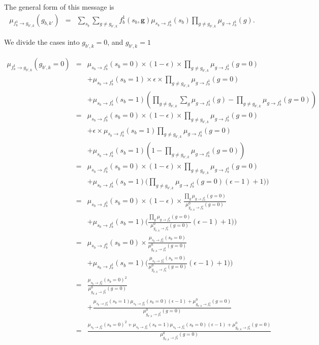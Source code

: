 \documentclass[11pt]{article}
\newcommand{\fb}[1]{f_b^{#1}}
\newcommand{\mSbFb}[1]{\mu_{s_{b} \rightarrow \fb{#1}}}
\begin{document}
The general form of this message is
\begin{eqnarray}
\mu_{\fb1 \rightarrow g_{b',k}}(g_{b,k'}) &=& \sum_{s_b} \sum_{g \neq g_{b',k}} \fb1(s_b,\mathbf{g}) \mSbFb1(s_b) \prod_{g \neq g_{b',k}} \mu_{g \rightarrow \fb1}(g).
\end{eqnarray}

We divide the cases into  $g_{b',k}=0$, and  $g_{b',k}=1$

\begin{eqnarray}
\mu_{\fb1 \rightarrow g_{b',k}}(g_{b',k}=0) &=& \mSbFb1(s_b=0) \times (1-\epsilon)  \times   \prod_{g \neq g_{b',k}}\mu_{g \rightarrow \fb1}(g=0) \\
& & +  \mSbFb1(s_b=1) \times \epsilon \times \prod_{g \neq g_{b',k}}\mu_{g \rightarrow \fb1}(g=0) \nonumber \\
& & +  \mSbFb1(s_b=1) (\prod_{g \neq g_{b',k}}\sum_{g} \mu_{g \rightarrow \fb1}(g) - \prod_{g \neq g_{b',k}} \mu_{g \rightarrow \fb1}(g=0) )  \nonumber \\
%
&=&  \mSbFb1(s_b=0) \times (1-\epsilon)  \times  \prod_{g \neq g_{b',k}}\mu_{g \rightarrow \fb1}(g=0) \\
& & + \epsilon \times \mSbFb1(s_b=1) \prod_{g \neq g_{b',k}}\mu_{g \rightarrow \fb1}(g=0) \nonumber \\
& & +  \mSbFb1(s_b=1) (1 - \prod_{g \neq g_{b',k}} \mu_{g \rightarrow \fb1}(g=0)) \nonumber \\
%
&=& \mSbFb1(s_b=0) \times (1-\epsilon)  \times  \prod_{g \neq g_{b',k}}\mu_{g \rightarrow \fb1}(g=0) \nonumber \\
& & +  \mSbFb1(s_b=1) \big(   \prod_{g \neq g_{b',k}} \mu_{g \rightarrow \fb1}(g=0)  (\epsilon -1) + 1)  \big) \\
&=&   \mSbFb1(s_b=0) \times (1-\epsilon)  \times \frac{ \prod_{g}\mu_{g \rightarrow \fb1}(g=0)}{\mu^0_{g_{b',k} \rightarrow \fb1}(g=0)}  \\
& & + \mSbFb1(s_b=1) \big( \frac{\prod_{g} \mu_{g \rightarrow \fb1}(g=0) }{\mu^0_{g_{b',k} \rightarrow \fb1}(g=0) }
 (\epsilon -1) + 1)  \big) \nonumber \\
&=&  \mSbFb1(s_b=0)  \times \frac{\mSbFb1(s_b=0)}{\mu^0_{g_{b',k} \rightarrow \fb1}(g=0)}  \\
& & + \mSbFb1(s_b=1) \big( \frac{\mSbFb1(s_b=0)}{\mu^0_{g_{b',k} \rightarrow \fb1}(g=0) } \nonumber
 (\epsilon -1) + 1)  \big) \nonumber \\
&=& \frac{\mSbFb1(s_b=0)^2}{\mu^0_{g_{b',k} \rightarrow \fb1}(g=0)}  \\
& & + \frac{\mSbFb1(s_b=1)\mSbFb1(s_b=0)(\epsilon-1) + \mu^0_{g_{b',k} \rightarrow \fb1}(g=0) }{\mu^0_{g_{b',k} \rightarrow \fb1}(g=0) } \nonumber \\
&=&  \frac{\mSbFb1(s_b=0)^2 + \mSbFb1(s_b=1)\mSbFb1(s_b=0)(\epsilon-1) + \mu^0_{g_{b',k} \rightarrow \fb1}(g=0) }{\mu^0_{g_{b',k} \rightarrow \fb1}(g=0) }
\end{eqnarray}
\end{document}
